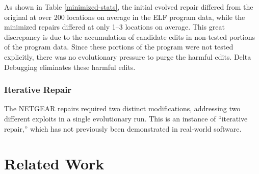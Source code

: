 \documentclass{sigcomm-alternate}
\begin{document}
As shown in Table \ref{minimized-stats}, the initial evolved repair
differed from the original at over 200 locations on average in the ELF
program data, while the minimized repairs differed at only 1--3
locations on average.  This great discrepancy is due to the
accumulation of candidate edits in non-tested portions of the program
data.  Since these portions of the program were not tested explicitly, there was
no evolutionary pressure to purge the harmful edits.  
Delta Debugging eliminates these harmful edits.

\subsubsection{Iterative Repair}
\label{iterative-repair}
The NETGEAR  repairs required two distinct modifications, addressing two different
exploits in a single evolutionary run.  This is an instance of
``iterative repair,'' which has not previously been demonstrated in
real-world software.

%


\section{Related Work}
\label{sec:related-work}
\end{document}
